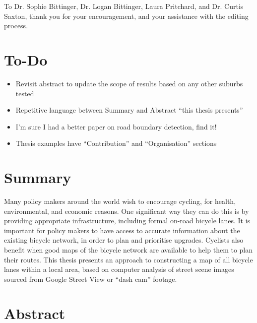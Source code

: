 \documentclass[11pt,twoside]{report}
\begin{document}
To Dr. Sophie Bittinger, Dr. Logan Bittinger, Laura Pritchard, and Dr. Curtis Saxton, thank you for your encouragement, and your assistance with the editing process.



\chapter*{To-Do}

\begin{itemize}
\item{Revisit abstract to update the scope of results based on any other suburbs tested}
\item{Repetitive language between Summary and Abstract ``this thesis presents''}
\item{I'm sure I had a better paper on road boundary detection, find it!}
\item{Thesis examples have ``Contribution'' and ``Organisation'' sections}
\end{itemize}

\chapter*{Summary}

Many policy makers around the world wish to encourage cycling, for health, environmental, and economic reasons.  One significant way they can do this is by providing appropriate infrastructure, including formal on-road bicycle lanes.  It is important for policy makers to have access to accurate information about the existing bicycle network, in order to plan and prioritise upgrades.  Cyclists also benefit when good maps of the bicycle network are available to help them to plan their routes.  This thesis presents an approach to constructing a map of all bicycle lanes within a local area, based on computer analysis of street scene  images sourced from Google Street View or ``dash cam'' footage.

\begingroup
\renewcommand{\cleardoublepage}{}
\renewcommand{\clearpage}{}
\chapter*{Abstract}
\endgroup
\end{document}
